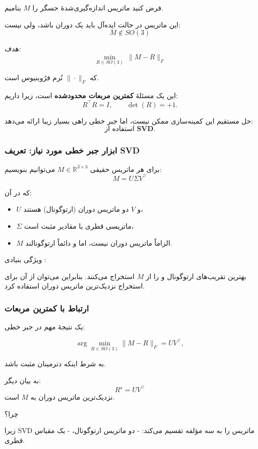 \documentclass{article}
\begin{document}
فرض کنید ماتریس اندازه‌گیری‌شدهٔ حسگر را $M$ بنامیم.

این ماتریس در حالت ایده‌آل باید یک دوران باشد، ولی نیست:
\[
M \notin SO(3)
\]

هدف:
\[
\min_{R\in SO(3)} \ \|M - R\|_F
\]

که $\|\cdot\|_F$ نُرم فرُوبنیوس است.

این یک مسئلهٔ \textbf{کمترین مربعات محدودشده} است،
زیرا داریم:
\[
R^\top R = I,\qquad \det(R)=+1.
\]

حل مستقیم این کمینه‌سازی ممکن نیست، اما جبر خطی راهی بسیار زیبا ارائه می‌دهد:
\[
\textbf{استفاده از SVD}.
\]


\subsubsection{ ابزار جبر خطی مورد نیاز: تعریف SVD}

برای هر ماتریس حقیقی $M\in\mathbb{R}^{3\times 3}$ می‌توانیم بنویسیم:
\[
M = U\Sigma V^\top
\]

که در آن:
\begin{itemize}
	\item $U$ و $V$ دو ماتریس دوران (ارتوگونال) هستند،
	\item $\Sigma$ ماتریسی قطری با مقادیر مثبت است،
	\item $M$ الزاماً ماتریس دوران نیست، اما  و  دائماً ارتوگونالند.
\end{itemize}

ویژگی بنیادی :

بهترین تقریب‌های ارتوگونال  و  را از $M$ استخراج می‌کنند. بنابراین می‌توان از آن برای استخراج نزدیک‌ترین ماتریس دوران استفاده کرد.


\subsubsection{ارتباط  با کمترین مربعات}

یک نتیجهٔ مهم در جبر خطی:

\[
\arg\min_{R\in SO(3)} \|M - R\|_F
= UV^\top,
\]

به شرط اینکه دترمینان مثبت باشد.

به بیان دیگر:
\[
R^\star = UV^\top
\]
نزدیک‌ترین ماتریس دوران به $M$ است.

چرا؟

زیرا SVD ماتریس را به سه مؤلفه تقسیم می‌کند:
- دو ماتریس ارتوگونال،
- یک مقیاس قطری.
\end{document}
